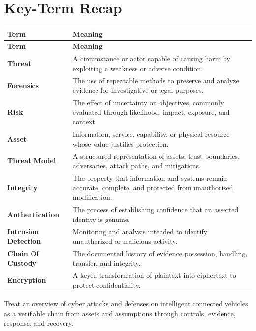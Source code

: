 \documentclass[11pt]{article}
\begin{document}
\section*{Key-Term Recap}
\begin{longtable}{>{\RaggedRight\arraybackslash}p{}>{\RaggedRight\arraybackslash}p{}}
\toprule\rowcolor{Navy}\color{white}\textbf{Term} & \color{white}\textbf{Meaning}\\\midrule
\endfirsthead
\toprule\rowcolor{Navy}\color{white}\textbf{Term} & \color{white}\textbf{Meaning}\\\midrule
\endhead
\textbf{Threat} & A circumstance or actor capable of causing harm by exploiting a weakness or adverse condition. \\\midrule
\textbf{Forensics} & The use of repeatable methods to preserve and analyze evidence for investigative or legal purposes. \\\midrule
\textbf{Risk} & The effect of uncertainty on objectives, commonly evaluated through likelihood, impact, exposure, and context. \\\midrule
\textbf{Asset} & Information, service, capability, or physical resource whose value justifies protection. \\\midrule
\textbf{Threat Model} & A structured representation of assets, trust boundaries, adversaries, attack paths, and mitigations. \\\midrule
\textbf{Integrity} & The property that information and systems remain accurate, complete, and protected from unauthorized modification. \\\midrule
\textbf{Authentication} & The process of establishing confidence that an asserted identity is genuine. \\\midrule
\textbf{Intrusion Detection} & Monitoring and analysis intended to identify unauthorized or malicious activity. \\\midrule
\textbf{Chain Of Custody} & The documented history of evidence possession, handling, transfer, and integrity. \\\midrule
\textbf{Encryption} & A keyed transformation of plaintext into ciphertext to protect confidentiality. \\\midrule
\bottomrule
\end{longtable}
\begin{takeawaybox}
Treat an overview of cyber attacks and defenses on intelligent connected vehicles as a verifiable chain from assets and assumptions through controls, evidence, response, and recovery.
\end{takeawaybox}
\end{document}

